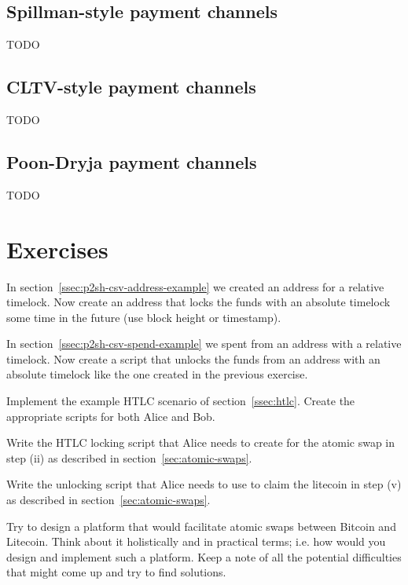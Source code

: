 \subsection*{Spillman-style payment channels}
TODO


\subsection*{CLTV-style payment channels}
TODO


\subsection*{Poon-Dryja payment channels}
TODO




\section{Exercises}

\begin{exercise}
In section~\ref{ssec:p2sh-csv-address-example} we created an address for a relative timelock. Now create an address that locks the funds with an absolute timelock some time in the future (use block height or timestamp).
\end{exercise}

\begin{exercise}
In section~\ref{ssec:p2sh-csv-spend-example} we spent from an address with a relative timelock. Now create a script that unlocks the funds from an address with an absolute timelock like the one created in the previous exercise.
\end{exercise}

\begin{exercise}
Implement the example HTLC scenario of section~\ref{ssec:htlc}. Create the appropriate scripts for both Alice and Bob.
\end{exercise}

\begin{exercise}
Write the HTLC locking script that Alice needs to create for the atomic swap in step (ii) as described in section~\ref{sec:atomic-swaps}. 
\end{exercise}

\begin{exercise}
Write the unlocking script that Alice needs to use to claim the litecoin in step (v) as described in section~\ref{sec:atomic-swaps}. 
\end{exercise}

\begin{exercise}
Try to design a platform that would facilitate atomic swaps between Bitcoin and Litecoin. Think about it holistically and in practical terms; i.e. how would you design and implement such a platform. Keep a note of all the potential difficulties that might come up and try to find solutions.
\end{exercise}



